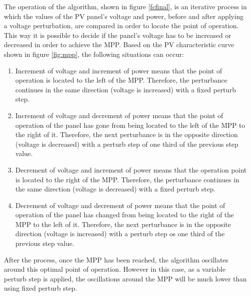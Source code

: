 The operation of the algorithm, shown in figure \ref{fcfinal}, is an iterative process in which the values of the PV panel's voltage and power, before and after applying a voltage perturbation, are compared  in order to locate the point of operation. This way it is possible to decide if the panel's voltage has to be increased or decreased in order to achieve the MPP. Based on the PV characteristic curve shown in figure \ref{fig:mpp}, the following situations can occur:

\begin{enumerate}
	\item Increment of voltage and increment of power means that the point of operation is located to the left of the MPP. Therefore, the perturbance continues in the same direction (voltage is increased) with a fixed perturb step. 
	\item Increment of voltage and decrement of power means that the point of operation of the panel has gone from being located to the left of the MPP to the right of it. Therefore, the next perturbance is in the opposite direction (voltage is decreased) with a perturb step of one third of the previous step value.
	\item Decrement of voltage and increment of power means that the operation point is located to the right of the MPP. Therefore, the perturbance continues in the same direction (voltage is decreased) with a fixed perturb step. 
	\item Decrement of voltage and decrement of power means that the point of operation of the panel has changed from being located to the right of the MPP to the left of it. Therefore, the next perturbance is in the opposite direction (voltage is increased) with a perturb step os one third of the previous step value.
\end{enumerate}

After the process, once the MPP has been reached, the algorithm oscillates around this optimal point of operation. However in this case, as a variable perturb step is applied, the oscillations around the MPP will be much lower than using fixed perturb step.  


